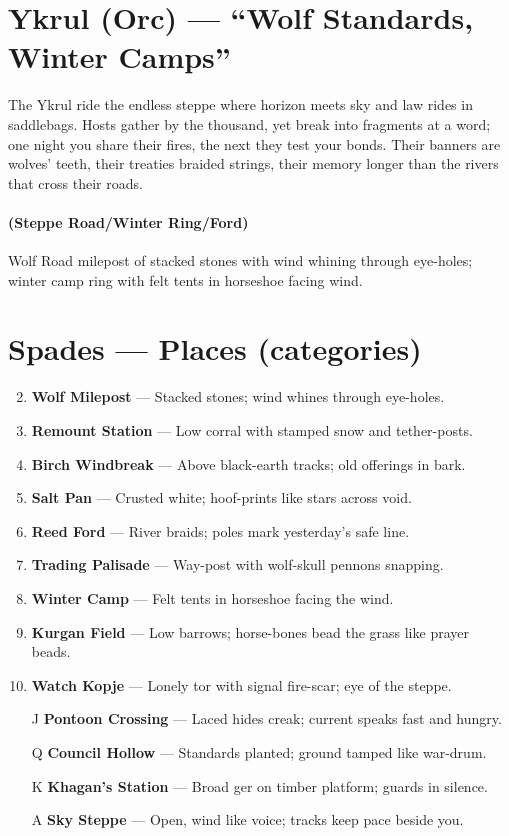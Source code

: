 \section{Ykrul (Orc) --- ``Wolf Standards, Winter Camps''}
\label{chap:ykrul}

\begin{tcolorbox}[colback=black!3,colframe=black!40!white,title={Theme \& Atmosphere}]
The Ykrul ride the endless steppe where horizon meets sky and law rides in saddlebags. Hosts gather by the thousand, yet break into fragments at a word; one night you share their fires, the next they test your bonds. Their banners are wolves' teeth, their treaties braided strings, their memory longer than the rivers that cross their roads.
\end{tcolorbox}

\paragraph*{(Steppe Road/Winter Ring/Ford)} Wolf Road milepost of stacked stones with wind whining through eye-holes; winter camp ring with felt tents in horseshoe facing wind.

\section*{Spades --- Places (categories)}
\label{sec:ykrul-places}
\begin{enumerate}
\setcounter{enumi}{1}
\item \textbf{Wolf Milepost} --- Stacked stones; wind whines through eye-holes.
\item \textbf{Remount Station} --- Low corral with stamped snow and tether-posts.
\item \textbf{Birch Windbreak} --- Above black-earth tracks; old offerings in bark.
\item \textbf{Salt Pan} --- Crusted white; hoof-prints like stars across void.
\item \textbf{Reed Ford} --- River braids; poles mark yesterday's safe line.
\item \textbf{Trading Palisade} --- Way-post with wolf-skull pennons snapping.
\item \textbf{Winter Camp} --- Felt tents in horseshoe facing the wind.
\item \textbf{Kurgan Field} --- Low barrows; horse-bones bead the grass like prayer beads.
\item \textbf{Watch Kopje} --- Lonely tor with signal fire-scar; eye of the steppe.
\item[J] \textbf{Pontoon Crossing} --- Laced hides creak; current speaks fast and hungry.
\item[Q] \textbf{Council Hollow} --- Standards planted; ground tamped like war-drum.
\item[K] \textbf{Khagan's Station} --- Broad ger on timber platform; guards in silence.
\item[A] \textbf{Sky Steppe} --- Open, wind like voice; tracks keep pace beside you.
\end{enumerate}

